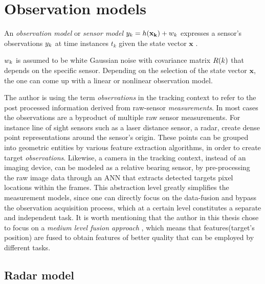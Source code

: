 
\section{Observation models}

An \emph{observation model} or \emph{sensor model} ${{y}}_k = h(\mathbf{x_k}) + {w}_k$ expresses a sensor's observations ${{y}}_k$ at time instances $t_k$ given the state vector $\mathbf{x}$ .

 ${w}_k$ is assumed to be white Gaussian noise with covariance matrix ${R}(k)$ that depends on the specific sensor. Depending on the selection of the state vector $\mathbf{x}$, the one can come up with a linear or nonlinear observation model.

The author is using the term \emph{observations} in the tracking context to refer to the post processed information derived from raw-sensor \emph{measurements}. In most cases the observations are a byproduct of multiple raw sensor measurements. For instance line of sight sensors such as a laser distance sensor, a radar, create dense point representations around the sensor's origin. These points can be grouped into geometric entities by various feature extraction algorithms, in order to create target \emph{observations}.  Likewise, a camera in the tracking context, instead of an imaging device, can be modeled as a relative bearing sensor, by pre-processing the raw image data through an ANN that extracts detected targets pixel locations within the frames. This abstraction level greatly simplifies the measurement models, since one can directly focus on the data-fusion and bypass the observation acquisition process, which at a certain level constitutes a separate and independent task. It is worth mentioning that the author in this thesis chose to focus on a \emph{medium level fusion approach} \cite{Luo2002}, which means that features(target's position) are fused to obtain features of better quality that can be employed by different tasks.





\subsection{Radar model}


